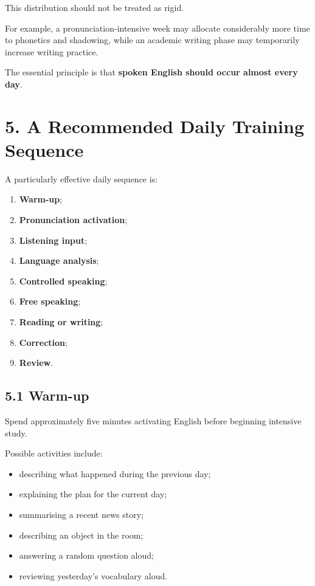 This distribution should not be treated as rigid.

For example, a pronunciation-intensive week may allocate considerably more time to phonetics and shadowing, while an academic writing phase may temporarily increase writing practice.

The essential principle is that \textbf{spoken English should occur almost every day}.

\section*{5. A Recommended Daily Training Sequence}

A particularly effective daily sequence is:

\begin{enumerate}
    \item \textbf{Warm-up};
    \item \textbf{Pronunciation activation};
    \item \textbf{Listening input};
    \item \textbf{Language analysis};
    \item \textbf{Controlled speaking};
    \item \textbf{Free speaking};
    \item \textbf{Reading or writing};
    \item \textbf{Correction};
    \item \textbf{Review}.
\end{enumerate}

\subsection*{5.1 Warm-up}

Spend approximately five minutes activating English before beginning intensive study.

Possible activities include:

\begin{itemize}
    \item describing what happened during the previous day;
    \item explaining the plan for the current day;
    \item summarising a recent news story;
    \item describing an object in the room;
    \item answering a random question aloud;
    \item reviewing yesterday's vocabulary aloud.
\end{itemize}

